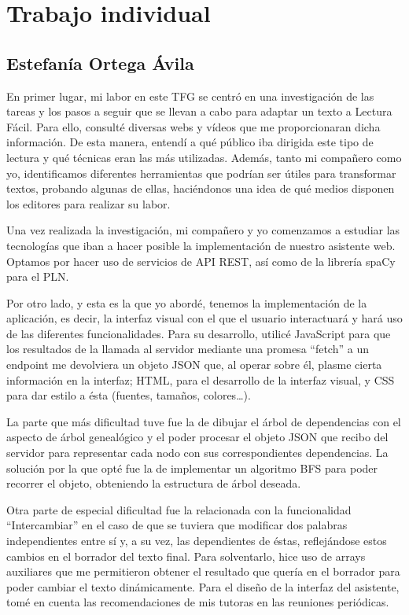 \chapter{Trabajo individual}
\label{cap:trabajoIndividual}

\section{Estefanía Ortega Ávila}

En primer lugar, mi labor en este TFG se centró en una investigación de las tareas y los pasos a seguir que se llevan a cabo para adaptar un texto a Lectura Fácil. Para ello, consulté diversas webs y vídeos que me proporcionaran dicha información. De esta manera, entendí a qué público iba dirigida este tipo de lectura y qué técnicas eran las más utilizadas. 
Además, tanto mi compañero como yo, identificamos diferentes herramientas que podrían ser útiles para transformar textos, probando algunas de ellas, haciéndonos una idea de qué medios disponen los editores para realizar su labor.

Una vez realizada la investigación, mi compañero y yo comenzamos a estudiar las tecnologías que iban a hacer posible la implementación de nuestro asistente web. Optamos por hacer uso de servicios de API REST, así como de la librería spaCy para el PLN.

Por otro lado, y esta es la que yo abordé, tenemos la implementación de la aplicación, es decir, la interfaz visual con el que el usuario interactuará y hará uso de las diferentes funcionalidades. Para su desarrollo, utilicé JavaScript para que los resultados de la llamada al servidor mediante una promesa ``fetch'' a un endpoint me devolviera un objeto JSON que, al operar sobre él, plasme cierta información en la interfaz;  HTML, para el desarrollo de la interfaz visual, y CSS para dar estilo a ésta (fuentes, tamaños, colores…).

La parte que más dificultad tuve fue la de dibujar el árbol de dependencias con el aspecto de árbol genealógico y el poder procesar el objeto JSON que recibo del servidor para representar cada nodo con sus correspondientes dependencias. La solución por la que opté fue la de implementar un algoritmo BFS para poder recorrer el objeto, obteniendo la estructura de árbol deseada.

Otra parte de especial dificultad fue la relacionada con la funcionalidad ``Intercambiar'' en el caso de que se tuviera que modificar dos palabras independientes entre sí y, a su vez, las dependientes de éstas, reflejándose estos cambios en el borrador del texto final. Para solventarlo, hice uso de arrays auxiliares que me permitieron obtener el resultado que quería en el borrador para poder cambiar el texto dinámicamente.
Para el diseño de la interfaz del asistente, tomé en cuenta las recomendaciones de mis tutoras en las reuniones periódicas.

